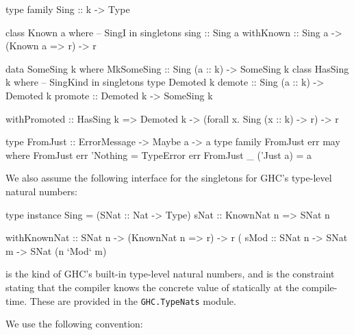 \documentclass[demotion-paper.tex]{subfiles}
\begin{document}
\begin{code}
type family Sing :: k -> Type

class Known a where -- SingI in singletons
  sing :: Sing a
withKnown :: Sing a -> (Known a => r) -> r

data SomeSing k where
  MkSomeSing :: Sing (a :: k) -> SomeSing k
class HasSing k where -- SingKind in singletons
  type Demoted k 
  demote :: Sing (a :: k) -> Demoted k
  promote :: Demoted k -> SomeSing k

withPromoted :: HasSing k
  => Demoted k
  -> (forall x. Sing (x :: k) -> r) -> r

type FromJust :: ErrorMessage -> Maybe a -> a
type family FromJust err may where 
  FromJust err 'Nothing = TypeError err
  FromJust _ ('Just a)  = a
\end{code}
We also assume the following interface for the singletons for GHC's type-level natural numbers:
\begin{code}
type instance Sing = (SNat :: Nat -> Type)
sNat :: KnownNat n => SNat n

withKnownNat :: SNat n -> (KnownNat n => r) -> r
(%
sMod :: SNat n -> SNat m -> SNat (n `Mod` m)
\end{code}
 is the kind of GHC's built-in type-level natural numbers, and  is the constraint stating that the compiler knows the concrete value of  statically at the compile-time.
These are provided in the \texttt{GHC.TypeNats} module.

We use the following convention:
\end{document}
